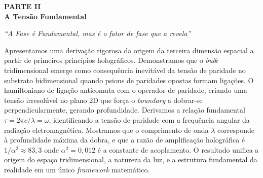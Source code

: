 \documentclass[12pt,a4paper,twoside]{article}
\newcommand{\alphaii}{\alpha^{2}}
\newcommand{\boundary}{\textit{boundary}}
\newcommand{\bulk}{\textit{bulk}}
\begin{document}
\newpage


\setcounter{section}{0}
\renewcommand{\thesection}{II.\arabic{section}}
\renewcommand{\theequation}{II.\arabic{equation}}
\renewcommand{\theHsection}{II.\arabic{section}} %
\setcounter{footnote}{0}

\begin{center}
\vspace*{1cm}
{\huge\bfseries\color{tglblue} PARTE II}\\[0.5cm]
{\LARGE\bfseries\color{tglblue} A Tens\~ao Fundamental}\\[0.3cm]
\vspace*{1cm}

{\large\itshape ``A Fase \'e Fundamental, mas \'e o fator de fase que a revela''}\\[0.3cm]
\vspace*{1.5cm}
\end{center}

\noindent Apresentamos uma deriva\c{c}\~ao rigorosa da origem da terceira dimens\~ao espacial a partir de primeiros princ\'ipios hologr\'aficos. Demonstramos que o \bulk{} tridimensional emerge como consequ\^encia inevit\'avel da tens\~ao de paridade no substrato bidimensional quando psions de paridades opostas formam liga\c{c}\~oes. O hamiltoniano de liga\c{c}\~ao anticomuta com o operador de paridade, criando uma tens\~ao irresol\'uvel no plano 2D que for\c{c}a o \boundary{} a dobrar-se perpendicularmente, gerando profundidade. Derivamos a rela\c{c}\~ao fundamental $\tau = 2\pi c/\lambda = \omega$, identificando a tens\~ao de paridade com a frequ\^encia angular da radia\c{c}\~ao eletromagn\'etica. Mostramos que o comprimento de onda $\lambda$ corresponde \`a profundidade m\'axima da dobra, e que a raz\~ao de amplifica\c{c}\~ao hologr\'afica \'e $1/\alphaii \approx 83{,}3$ onde $\alphaii = 0{,}012$ \'e a constante de acoplamento. O resultado unifica a origem do espa\c{c}o tridimensional, a natureza da luz, e a estrutura fundamental da realidade em um \'unico \textit{framework} matem\'atico.

\end{document}
